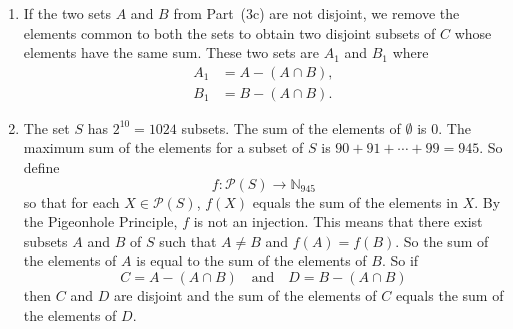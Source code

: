 \begin{enumerate}
\begin{enumerate}
\item If the two sets $A$ and $B$ from Part~(3c) are not disjoint, we remove the elements common to both the sets to obtain two disjoint subsets of $C$ whose elements have the same sum.  These two sets are $A_1$ and $B_1$ where
\[
\begin{aligned}
A_1 &= A - \left( A \cap B \right), \\
B_1 &= B - \left( A \cap B \right).
\end{aligned}
\]


\item The set $S$ has $2^{10} = 1024$ subsets.  The sum of the elements of $\emptyset$ is 0.  The maximum sum of the elements for a subset of $S$ is $90 + 91 + \cdots + 99 = 945$.  So define
\[
f: \mathcal{P} \left( S \right) \to \mathbb{N}_{945}
\]
so that for each $X \in \mathcal{P} \left( S \right)$, $f \left( X \right) $ equals the sum of the elements in $X$.  By the Pigeonhole Principle, $f$ is not an injection.  This means that there exist subsets $A$ and $B$ of $S$ such that $A \ne B$ and 
$f \left( A \right) = f \left( B \right)$.  So the sum of the elements of $A$ is equal to the sum of the elements of $B$.  So if
\[
C = A - \left( A \cap B \right) \quad \text{and} \quad D = B - \left( A \cap B \right)
\]
then $C$ and $D$ are disjoint and the sum of the elements of $C$ equals the sum of the elements of $D$.

\end{enumerate}


\end{enumerate}

\hbreak

\endinput
